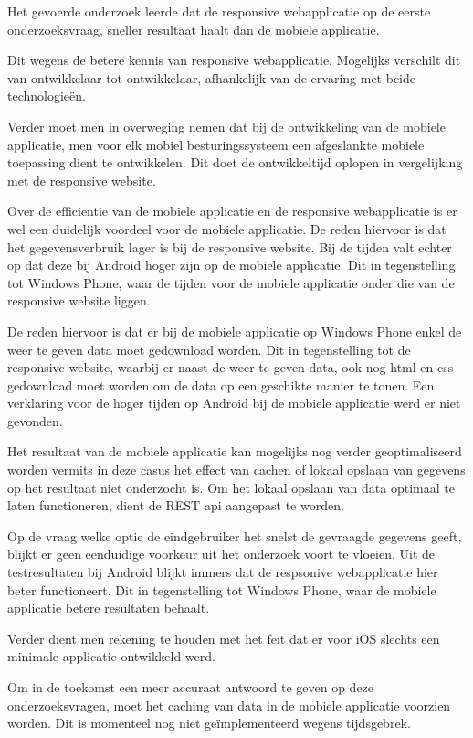 Het gevoerde onderzoek leerde dat de responsive webapplicatie op de eerste onderzoeksvraag, sneller resultaat haalt dan de mobiele applicatie.

Dit wegens de betere kennis van responsive webapplicatie. Mogelijks verschilt dit van ontwikkelaar tot ontwikkelaar,
afhankelijk van de ervaring met beide technologieën.

Verder moet men in overweging nemen dat bij de ontwikkeling van de mobiele applicatie, men voor elk mobiel besturingssysteem een afgeslankte mobiele toepassing dient te ontwikkelen.
Dit doet de ontwikkeltijd oplopen in vergelijking met de responsive website.

Over de efficientie van de mobiele applicatie en de responsive webapplicatie is er wel een duidelijk voordeel voor de mobiele applicatie.
De reden hiervoor is dat het gegevensverbruik lager is bij de responsive website.
Bij de tijden valt echter op dat deze bij Android hoger zijn op de mobiele applicatie. Dit in tegenstelling tot Windows Phone, waar de tijden voor de mobiele applicatie onder die van de responsive website liggen.

De reden hiervoor is dat er bij de mobiele applicatie op Windows Phone enkel de weer te geven data moet gedownload worden. Dit in tegenstelling tot de responsive website, waarbij er naast de weer te geven data, ook nog html
en css gedownload moet worden om de data op een geschikte manier te tonen. Een verklaring voor de hoger tijden op Android bij de mobiele applicatie werd er niet gevonden.

Het resultaat van de mobiele applicatie kan mogelijks nog verder geoptimaliseerd worden vermits in deze casus het effect van cachen of lokaal opslaan van gegevens op het resultaat niet onderzocht is.
Om het lokaal opslaan van data optimaal te laten functioneren, dient de REST api aangepast te worden.

Op de vraag welke optie de eindgebruiker het snelst de gevraagde gegevens geeft, blijkt er geen eenduidige voorkeur uit het onderzoek voort te vloeien.
Uit de testresultaten bij Android blijkt immers dat de respsonive webapplicatie hier beter functioneert. Dit in tegenstelling tot Windows Phone, waar de mobiele applicatie betere
resultaten behaalt.

Verder dient men rekening te houden met het feit dat er voor iOS slechts een minimale applicatie ontwikkeld werd.

Om in de toekomst een meer accuraat antwoord te geven op deze onderzoeksvragen, moet het caching van data in de mobiele applicatie voorzien worden.
Dit is momenteel nog niet geïmplementeerd wegens tijdsgebrek.
